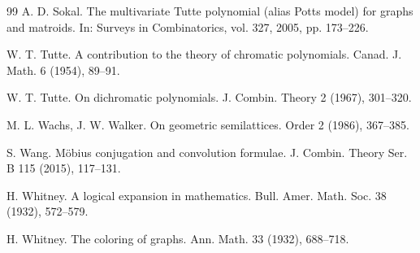 \documentclass[12pt]{article}%
\numberwithin{equation}{section}
\begin{document}
\begin{thebibliography}{99}
A. D. Sokal. The multivariate Tutte polynomial (alias Potts model) for graphs and matroids. In: Surveys in Combinatorics, vol. 327, 2005, pp. 173--226.

W. T. Tutte. A contribution to the theory of chromatic polynomials. Canad. J. Math. 6 (1954), 89--91.

W. T. Tutte. On dichromatic polynomials. J. Combin. Theory 2 (1967), 301--320.

M. L. Wachs, J. W. Walker. On geometric semilattices. Order 2 (1986), 367--385.

S. Wang. M\"obius conjugation and convolution formulae. J. Combin. Theory Ser. B 115 (2015), 117--131.

H. Whitney. A logical expansion in mathematics. Bull. Amer. Math. Soc. 38 (1932), 572--579.

H. Whitney. The coloring of graphs. Ann. Math. 33 (1932), 688--718.
\end{thebibliography}
\end{document}
